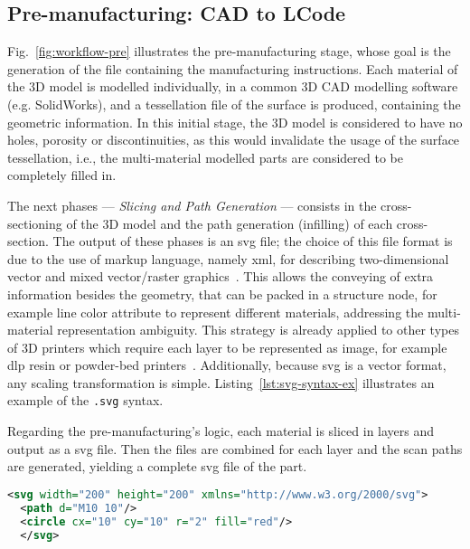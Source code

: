 \subsection{Pre-manufacturing: CAD to LCode}%
\label{subsec:cad-to-lcode}
Fig.~\ref{fig:workflow-pre} illustrates the pre-manufacturing stage, whose goal
is the generation of the file containing the manufacturing instructions.
Each material of the 3D model is modelled individually, in a common 3D CAD
modelling software (e.g. SolidWorks), and a tessellation file of the surface is
produced, containing the geometric information.
In this initial stage, the 3D model is considered to have no holes, porosity or
discontinuities, as this would invalidate the usage of the surface tessellation,
i.e., the multi-material modelled parts are considered to be completely filled in. 

The next phases --- \emph{Slicing and Path Generation} --- consists in the
cross-sectioning of the 3D model and the path generation (infilling) of each
cross-section.
The output of these phases is an \gls{svg} file; the choice of this file
format is due to the use of markup language, namely \gls{xml}, for describing
two-dimensional vector and mixed vector/raster graphics~\cite{svg_spec}.
This
allows the conveying of extra information besides the geometry, that can be
packed in a structure node, for example line color attribute to represent
different materials, addressing the multi-material representation
ambiguity.
This strategy is already applied to other types of 3D printers which
require each layer to be represented as image, for example \gls{dlp} resin or
powder-bed printers~\cite{Slic3r}.
Additionally, because \gls{svg} is a vector format, any scaling
transformation is simple.
%
Listing~\ref{lst:svg-syntax-ex} illustrates an
example of the \texttt{.svg} syntax.

Regarding the pre-manufacturing's logic, each material is sliced in layers and
output as a \gls{svg} file. Then the files are combined for each layer and the
scan paths are generated, yielding a complete \gls{svg} file of the part.

\begin{lstlisting}[language=xml, basicstyle=\tiny, caption=SVG syntax example, label=lst:svg-syntax-ex]
<svg width="200" height="200" xmlns="http://www.w3.org/2000/svg">
  <path d="M10 10"/>
  <circle cx="10" cy="10" r="2" fill="red"/>
  </svg>
\end{lstlisting}

